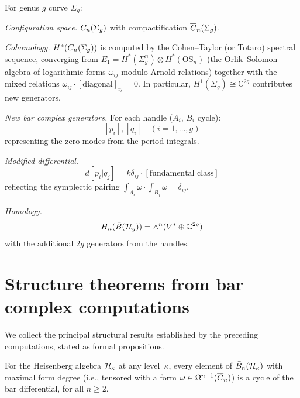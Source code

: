 \begin{computation}\label{comp:bar-genus-g}
For genus $g$ curve $\Sigma_g$:

\emph{Configuration space.} $C_n(\Sigma_g)$ with compactification
$\overline{C}_n(\Sigma_g)$.

\emph{Cohomology.}
$H^*(C_n(\Sigma_g))$ is computed by the Cohen--Taylor (or Totaro) spectral sequence, converging from $E_1 = H^*(\Sigma_g^n) \otimes H^*(\text{OS}_n)$ (the Orlik--Solomon algebra of logarithmic forms $\omega_{ij}$ modulo Arnold relations) together with the mixed relations $\omega_{ij} \cdot [\text{diagonal}]_{ij} = 0$.  In particular, $H^1(\Sigma_g) \cong \mathbb{C}^{2g}$ contributes new generators.

\emph{New bar complex generators.} For each handle ($A_i$, $B_i$ cycle):
\[
[p_i], [q_i] \quad (i = 1, \ldots, g)
\]
representing the zero-modes from the period integrals.

\emph{Modified differential.}
\[
d[p_i | q_j] = k\delta_{ij} \cdot [\text{fundamental class}]
\]
reflecting the symplectic pairing $\int_{A_i} \omega \cdot \int_{B_j} \omega = \delta_{ij}$.

\emph{Homology.}
\[
H_n(\bar{B}(\mathcal{H}_g)) = \wedge^n(V^* \oplus \mathbb{C}^{2g})
\]
with the additional $2g$ generators from the handles.
\end{computation}


\section{Structure theorems from bar complex computations}
\label{sec:bar-structure-theorems}

We collect the principal structural results established by the preceding
computations, stated as formal propositions.

\begin{proposition}
\label{prop:heisenberg-maximal-form-cycles}
For the Heisenberg algebra $\mathcal{H}_\kappa$ at any level~$\kappa$, every element
of $\bar{B}_n(\mathcal{H}_\kappa)$ with maximal form degree (i.e., tensored with a form
$\omega \in \Omega^{n-1}(\overline{C}_n)$) is a cycle of the bar
differential, for all $n \geq 2$.
\end{proposition}

